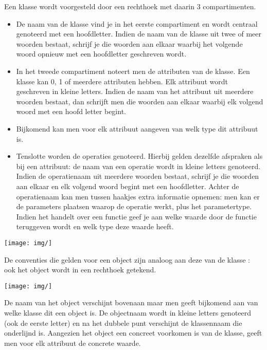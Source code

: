 Een klasse wordt voorgesteld door een rechthoek met daarin 3 compartimenten.

\begin{itemize}
    \item De naam van de klasse vind je in het eerste compartiment en wordt centraal genoteerd met een hoofdletter. Indien de naam van de klasse uit twee of meer woorden bestaat, schrijf je die woorden aan elkaar waarbij het volgende woord opnieuw met een hoofdletter geschreven wordt.
    \item In het tweede compartiment noteert men de attributen van de klasse. Een klasse kan 0, 1 of meerdere attributen hebben. Elk attribuut wordt geschreven in kleine letters. Indien de naam van het attribuut uit meerdere woorden bestaat, dan schrijft men die woorden aan elkaar waarbij elk volgend woord met een hoofd letter begint.
    \item Bijkomend kan men voor elk attribuut aangeven van welk type dit attribuut is.
    \item Tenslotte worden de operaties genoteerd. Hierbij gelden dezelfde afspraken als bij een attribuut: de naam van een operatie wordt in kleine letters genoteerd. Indien de operatienaam uit meerdere woorden bestaat, schrijf je die woorden aan elkaar en elk volgend woord begint met een hoofdletter. Achter de operatienaam kan men tussen haakjes extra informatie opnemen: men kan er de parameters plaatsen waarop de operatie werkt, plus het parametertype. Indien het handelt over een functie geef je aan welke waarde door de functie teruggeven wordt en welk type deze waarde heeft.
\end{itemize}


\begin{center}
\texttt{[image: img/]}%
\label{labelname}%
\end{center}

De conventies die gelden voor een object zijn analoog aan deze van de klasse : ook het object wordt in een rechthoek getekend.


\begin{center}
\texttt{[image: img/]}%
\label{labelname}%
\end{center}

De naam van het object verschijnt bovenaan maar men geeft bijkomend aan van welke klasse dit een object is. De objectnaam wordt in kleine letters genoteerd (ook de eerste letter) en na het dubbele punt verschijnt de klassennaam die onderlijnd is.
Aangezien het object een concreet voorkomen is van de klasse, geeft men voor elk attribuut de concrete waarde.

